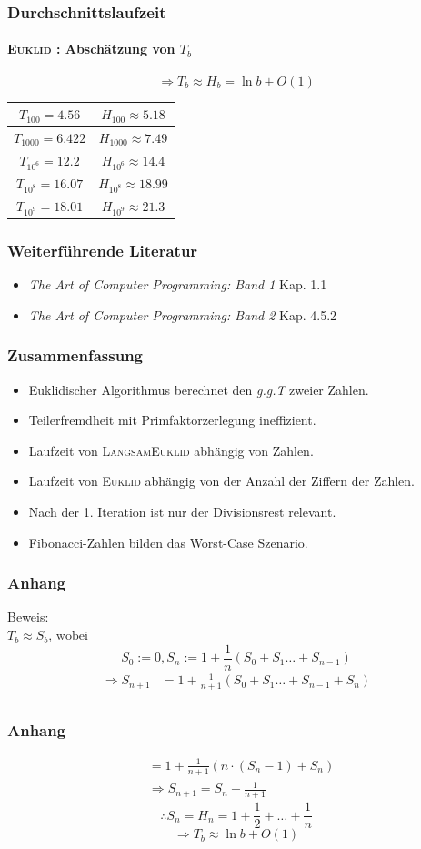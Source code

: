\documentclass[•]{beamer}
\begin{document}
\begin{frame}
\frametitle{Durchschnittslaufzeit}
\framesubtitle{\textsc{Euklid} : Absch\"atzung von $T_b$}
$$ \Rightarrow T_b \approx H_b = \ln b + O(1)$$
\pause
 \begin{center}
 \begin{tabular}{|c|c|} \hline
 $T_{100} = 4.56$ & $H_{100} \approx 5.18$ \\ \hline
 $T_{1000} = 6.422$ & $H_{1000} \approx 7.49$ \\
  \hline
 $T_{10^6} = 12.2$ & $H_{10^6} \approx 14.4$ \\ \hline
  $T_{10^8} = 16.07$ & $H_{10^8} \approx 18.99$ \\ \hline
    $T_{10^9} = 18.01$ & $H_{10^9} \approx 21.3$ \\ \hline
  
	 \end{tabular}
	  \end{center}

\end{frame}

\begin{frame}
\frametitle{Weiterf\"uhrende Literatur}
\begin{itemize}
\item \textit{The Art of Computer Programming: Band 1} Kap. 1.1
\item \textit{The Art of Computer Programming: Band 2} Kap. 4.5.2
\end{itemize}
\end{frame}

\begin{frame}
\frametitle{Zusammenfassung}
\begin{itemize}
\item Euklidischer Algorithmus berechnet den \textit{g.g.T} zweier Zahlen.
\item Teilerfremdheit mit Primfaktorzerlegung ineffizient.
\item Laufzeit von \textsc{LangsamEuklid} abh\"angig von Zahlen.
\item Laufzeit von \textsc{Euklid} abh\"angig von der Anzahl der Ziffern der Zahlen.
\item Nach der 1. Iteration ist nur der Divisionsrest relevant.
\item Fibonacci-Zahlen bilden das Worst-Case Szenario.
\end{itemize}
\end{frame}

\begin{frame}
\frametitle{Anhang}
	Beweis:\\
	$ T_b \approx S_b \text{, wobei }$ $$S_0 := 0, S_n := 1 + \frac{1}{n} (S_0 + S_1 \dots + S_{n-1})$$
	\begin{align*}
	\Rightarrow S_{n+1} &= 1 + \frac{1}{n+1}(S_0 + S_1 \dots + S_{n-1}+ S_n)\\
	\end{align*}
	
\end{frame}

\begin{frame}
\frametitle{Anhang}
\begin{align*}
&= 1 + \frac{1}{n+1}(n\cdot (S_n - 1) + S_n)\\
	&\Rightarrow S_{n+1}= S_n + \frac{1}{n+1}
\end{align*}
$$\therefore S_n = H_n = 1 + \frac{1}{2} + \dots +\frac{1}{n}$$ $$ \Rightarrow T_b \approx \ln b + O(1)$$

\end{frame}
\end{document}
